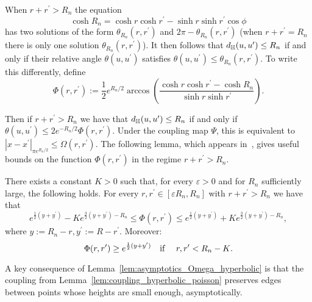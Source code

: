 
When $r + r^\prime > R_n$ the equation 
\[
	\cosh R_n =\cosh r \cosh r^\prime - \sinh r \sinh r^\prime \cos \phi
\]
has two solutions of the form $\theta_{R_n}(r,r^\prime)$ and $2\pi - \theta_{R_n}(r,r^\prime)$ (when $r + r^\prime = R_n$ there is only one solution $\theta_{R_n}(r,r^\prime)$). It then follows that $d_{\mathbb{H}}(u,u^\prime) \leq R_n$ if and only if their relative angle $\theta(u, u^\prime)$ satisfies $\theta(u, u^\prime) \leq \theta_{R_n}(r,r^\prime)$.
To write this differently, define
\begin{equation}\label{eq:def_Omega_hyperbolic}
	\Phi(r,r^\prime) := \frac{1}{2}e^{R_n/2} \arccos\left( \frac{\cosh r \cosh r^\prime - \cosh R_n}
	{\sinh r \sinh r^\prime} \right).
\end{equation}


Then if $r + r^\prime > R_n$ we have that $d_{\mathbb{H}}(u,u^\prime) \leq R_n$ if and only if $\theta(u, u^\prime) \leq 2 e^{-R_n/2}\Phi(r,r^\prime)$. Under the coupling map $\Psi$, this is equivalent to $|x-x^\prime|_{\pi e^{R_n/2}} \le \Omega(r,r^\prime)$. The following lemma, which appears in~\cite{fountoulakis2018law}, gives useful bounds on the function $\Phi(r,r^\prime)$ in the regime $r + r^\prime > R_n$.

\begin{lemma}\label{lem:asymptotics_Omega_hyperbolic}
There exists a constant $K>0$ such that, for every $\varepsilon > 0$ and for $R_n$ sufficiently large, the following holds.
For every $r,r^\prime \in [\varepsilon R_n,R_n]$ with $r + r^\prime > R_n$ we have that 
\begin{equation}\label{eq:asymp1}
	e^{\frac{1}{2}(y+y^\prime)} - K e^{\frac{3}{2}(y+y^\prime) - R_n} \leq \Phi(r, r^\prime) 
	\leq  e^{\frac{1}{2}(y+y^\prime)} + K e^{\frac{3}{2}(y+y^\prime) - R_n},
\end{equation}
where $y := R_n - r, y^\prime := R - r^\prime$. 
Moreover:
\begin{equation}\label{eq:asymp2} 
\Phi(r,r^\prime) \geq e^{\frac12(y+y^\prime)} \quad \text{if \quad $r, r^\prime < R_n - K$.} 
\end{equation}
\end{lemma}

A key consequence of Lemma~\ref{lem:asymptotics_Omega_hyperbolic} is that the coupling from Lemma~\ref{lem:coupling_hyperbolic_poisson} preserves edges between points whose heights are small enough, asymptotically.  

